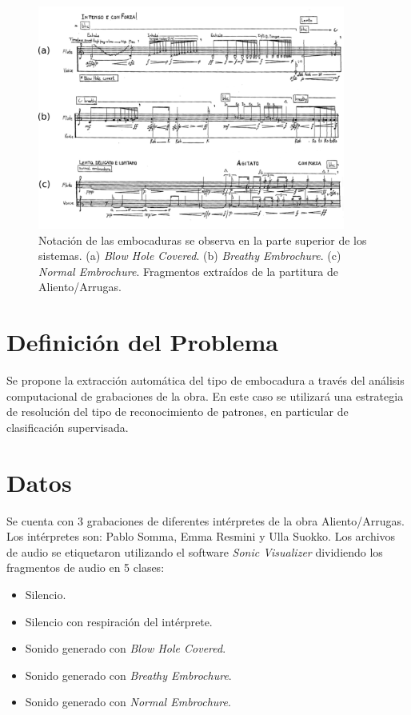 \documentclass{article}
\begin{document}
\begin{figure}[H]
\begin{center}
\includegraphics[width=0.9\textwidth]{embocaduras} 
\caption{Notación de las embocaduras se observa en la parte superior de los sistemas. (a) \textit{Blow Hole Covered}. (b) \textit{Breathy Embrochure}. (c) \textit{Normal Embrochure}. Fragmentos extraídos de la partitura de Aliento/Arrugas.}
\label{fig:embocaduras}
\end{center}
\end{figure}

\section*{Definición del Problema}
Se propone la extracción automática del tipo de embocadura a través del análisis computacional de grabaciones de la obra. En este caso se utilizará una estrategia de resolución del tipo de reconocimiento de patrones, en particular de clasificación supervisada. 

\section*{Datos}
Se cuenta con 3 grabaciones de diferentes intérpretes de la obra Aliento/Arrugas. Los intérpretes son: Pablo Somma, Emma Resmini y Ulla Suokko. Los archivos de audio se etiquetaron utilizando el software \textit{Sonic Visualizer} dividiendo los fragmentos de audio en 5 clases:

\begin{itemize} 
  \item Silencio.
  \item Silencio con respiración del intérprete. 
  \item Sonido generado con \textit{Blow Hole Covered}.
  \item Sonido generado con \textit{Breathy Embrochure}.
  \item Sonido generado con \textit{Normal Embrochure}.
\end{itemize}
\end{document}
